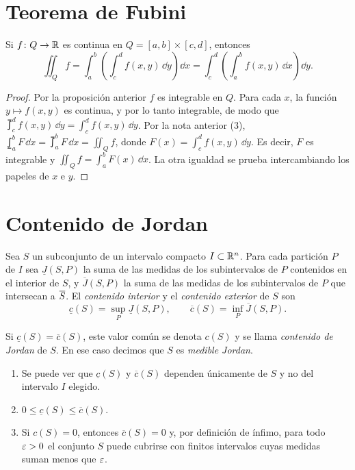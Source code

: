 \section{Teorema de Fubini}

\begin{corollary}
  Si \(f\colon Q \to \mathbb{R}\) es continua en \(Q = [a, b] \times [c, d]\), entonces
  \[
    \iint_Q f = \int_a^b \left( \int_c^d f(x, y) \,\dd y \right) \dd x = \int_c^d \left( \int_a^b f(x, y) \,\dd x \right) \dd y.
  \]
\end{corollary}

\begin{proof}
  Por la proposición anterior \(f\) es integrable en \(Q\). Para cada \(x\), la función \(y \mapsto f(x, y)\) es continua, y por lo tanto integrable, de modo que \(\upint_c^d f(x, y) \,\dd y = \int_c^d f(x, y) \,\dd y\). Por la nota anterior (3), \(\lowint_a^b F \,\dd x = \upint_a^b F \,\dd x = \iint_Q f\), donde \(F(x) = \int_c^d f(x, y) \,\dd y\). Es decir, \(F\) es integrable y \(\iint_Q f = \int_a^b F(x) \,\dd x\). La otra igualdad se prueba intercambiando los papeles de \(x\) e \(y\).
\end{proof}

\section{Contenido de Jordan}

\begin{definition}
  Sea \(S\) un subconjunto de un intervalo compacto \(I \subset \mathbb{R}^n\). Para cada partición \(P\) de \(I\) sea \(\underline{J}(S, P)\) la suma de las medidas de los subintervalos de \(P\) contenidos en el interior de \(S\), y \(\overline{J}(S, P)\) la suma de las medidas de los subintervalos de \(P\) que intersecan a \(\overline{S}\). El \emph{contenido interior} y el \emph{contenido exterior} de \(S\) son
  \[
    \underline{c}(S) = \sup_P \underline{J}(S, P), \qquad \overline{c}(S) = \inf_P \overline{J}(S, P).
  \]
\end{definition}

\begin{definition}
  Si \(\underline{c}(S) = \overline{c}(S)\), este valor común se denota \(c(S)\) y se llama \emph{contenido de Jordan} de \(S\). En ese caso decimos que \(S\) es \emph{medible Jordan}.
\end{definition}

\begin{note}
  \begin{enumerate}[label=(\arabic*)]
    \item Se puede ver que \(\underline{c}(S)\) y \(\overline{c}(S)\) dependen únicamente de \(S\) y no del intervalo \(I\) elegido.
    \item \(0 \leq \underline{c}(S) \leq \overline{c}(S)\).
    \item Si \(c(S) = 0\), entonces \(\overline{c}(S) = 0\) y, por definición de ínfimo, para todo \(\varepsilon > 0\) el conjunto \(S\) puede cubrirse con finitos intervalos cuyas medidas suman menos que \(\varepsilon\).
  \end{enumerate}
\end{note}
